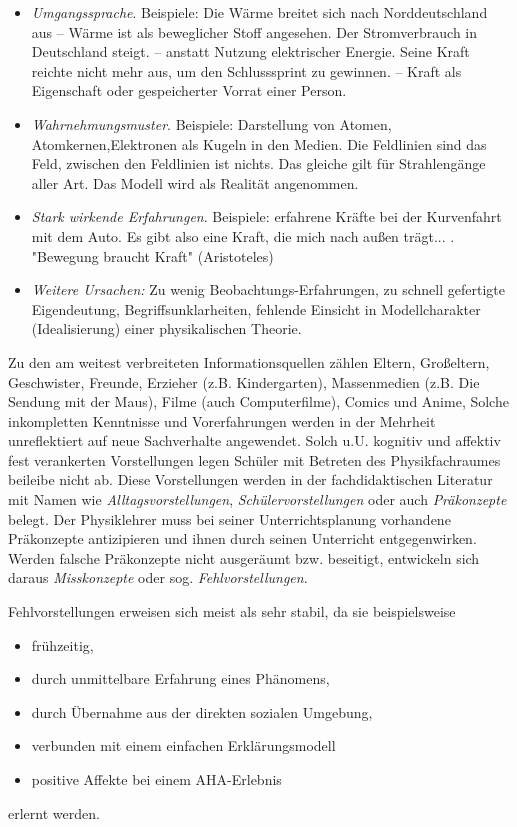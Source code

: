 \begin{itemize}
\item
\emph{Umgangssprache}. Beispiele: {\glqq}Die W{\"a}rme breitet sich nach Norddeutschland aus{\grqq} $\textrm{--}$  W{\"a}rme ist als beweglicher Stoff angesehen. {\glqq}Der Stromverbrauch in Deutschland steigt.{\grqq} $\textrm{--}$  anstatt Nutzung elektrischer Energie. {\glqq}Seine Kraft reichte nicht mehr aus, um den Schlusssprint zu gewinnen.{\grqq} $\textrm{--}$ Kraft als Eigenschaft oder gespeicherter Vorrat einer Person. 
\item
\emph{Wahrnehmungsmuster}. Beispiele: Darstellung von Atomen, Atomkernen,Elektronen als Kugeln in den Medien. Die Feldlinien sind das Feld, zwischen den Feldlinien ist nichts. Das gleiche gilt f{\"u}r Strahleng{\"a}nge aller Art. Das Modell wird  als Realit{\"a}t angenommen.
\item
\emph{Stark wirkende Erfahrungen}. Beispiele: erfahrene Kr{\"a}fte bei der Kurvenfahrt mit dem Auto. Es gibt also eine Kraft, die mich nach au{\ss}en tr{\"a}gt... . "Bewegung braucht Kraft" (Aristoteles)
\item
\emph{Weitere Ursachen:} Zu wenig Beobachtungs-Erfahrungen, zu schnell gefertigte Eigendeutung, Begriffsunklarheiten, fehlende Einsicht in Modellcharakter (Idealisierung) einer physikalischen Theorie. 
\end{itemize}

Zu den am weitest verbreiteten Informationsquellen z{\"a}hlen Eltern, Gro{\ss}eltern, Geschwister, Freunde, Erzieher (z.B. Kindergarten), Massenmedien (z.B. Die Sendung mit der Maus), Filme (auch Computerfilme), Comics und Anime,  Solche inkompletten Kenntnisse und Vorerfahrungen werden in der Mehrheit unreflektiert auf neue Sachverhalte angewendet.
\mip
Solch u.U. kognitiv und affektiv fest verankerten Vorstellungen legen Sch{\"u}ler mit Betreten des Physikfachraumes beileibe nicht ab. Diese Vorstellungen werden in der fachdidaktischen Literatur mit Namen wie \emph{Alltagsvorstellungen}, \emph{Sch{\"u}lervorstellungen} oder auch \emph{Pr{\"a}konzepte} belegt. Der Physiklehrer muss bei seiner Unterrichtsplanung  vorhandene Pr{\"a}konzepte antizipieren und ihnen durch seinen Unterricht entgegenwirken. Werden falsche Pr{\"a}konzepte nicht ausger{\"a}umt bzw. beseitigt, entwickeln sich daraus \emph{Misskonzepte} oder sog. \emph{Fehlvorstellungen}.

Fehlvorstellungen erweisen sich meist als sehr stabil, da sie beispielsweise
\begin{itemize}
\item fr\"{u}hzeitig,
\item durch unmittelbare Erfahrung eines Ph\"{a}nomens,
\item durch \"{U}bernahme aus der direkten sozialen Umgebung,
\item verbunden mit einem einfachen Erkl\"{a}rungsmodell
\item positive Affekte bei einem AHA-Erlebnis
\end{itemize}
erlernt werden.

